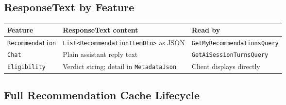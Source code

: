 \documentclass[11pt,a4paper]{article}
\begin{document}
\subsection{ResponseText by Feature}

\begin{center}
\begin{tabular}{lp{5.5cm}p{5.0cm}}
\toprule
\textbf{Feature} & \textbf{ResponseText content} & \textbf{Read by}\\
\midrule
\texttt{Recommendation} &
  \texttt{List<RecommendationItemDto>} as JSON &
  \texttt{GetMyRecommendationsQuery}\\
\texttt{Chat} &
  Plain assistant reply text &
  \texttt{GetAiSessionTurnsQuery}\\
\texttt{Eligibility} &
  Verdict string; detail in \texttt{MetadataJson} &
  Client displays directly\\
\bottomrule
\end{tabular}
\end{center}

\subsection{Full Recommendation Cache Lifecycle}
\end{document}
